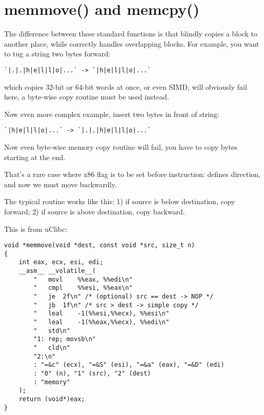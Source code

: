 \section{memmove() and memcpy()}
\label{memmove_and_DF}

The difference between these standard functions is that  blindly copies a block to another place,
while  correctly handles overlapping blocks.
For example, you want to tug a string two bytes forward:

\begin{lstlisting}
`|.|.|h|e|l|l|o|...` -> `|h|e|l|l|o|...`
\end{lstlisting}

 which copies 32-bit or 64-bit words at once, or even \ac{SIMD},
will obviously fail here, a byte-wise copy routine must be used instead.

Now even more complex example, insert two bytes in front of string:

\begin{lstlisting}
`|h|e|l|l|o|...` -> `|.|.|h|e|l|l|o|...`
\end{lstlisting}

Now even byte-wise memory copy routine will fail, you have to copy bytes starting at the end.

That's a rare case where  x86 flag is to be set before  instruction:
 defines direction, and now we must move backwardly.

The typical  routine works like this:
1) if source is below destination, copy forward;
2) if source is above destination, copy backward.

This is  from uClibc:

\begin{lstlisting}
void *memmove(void *dest, const void *src, size_t n)
{
	int eax, ecx, esi, edi;
	__asm__ __volatile__(
		"	movl	%%eax, %%edi\n"
		"	cmpl	%%esi, %%eax\n"
		"	je	2f\n" /* (optional) src == dest -> NOP */
		"	jb	1f\n" /* src > dest -> simple copy */
		"	leal	-1(%%esi,%%ecx), %%esi\n"
		"	leal	-1(%%eax,%%ecx), %%edi\n"
		"	std\n"
		"1:	rep; movsb\n"
		"	cld\n"
		"2:\n"
		: "=&c" (ecx), "=&S" (esi), "=&a" (eax), "=&D" (edi)
		: "0" (n), "1" (src), "2" (dest)
		: "memory"
	);
	return (void*)eax;
}
\end{lstlisting}

